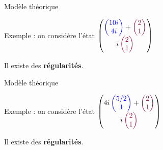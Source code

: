 \begin{frame}[noframenumbering]{Modèle théorique} %

  Exemple : on considère l'état $\begin{pmatrix}
    \color{blue} \begin{pmatrix} 10i \\ 4i \end{pmatrix} \color{black} + \color{cs} \begin{pmatrix} 2 \\ 1 \end{pmatrix}
  \\ \color{black} i \color{cs} \begin{pmatrix} 2 \\ 1 \end{pmatrix}
  \end{pmatrix}$

  \vspace{1em}
  Il existe des \textbf{régularités}.
\end{frame}

\begin{frame}[noframenumbering]{Modèle théorique} %

  Exemple : on considère l'état $\begin{pmatrix}
    4i \color{blue} \begin{pmatrix} 5/2 \\ 1 \end{pmatrix} \color{black} + \color{cs} \begin{pmatrix} 2 \\ 1 \end{pmatrix}
  \\ \color{black} i \color{cs} \begin{pmatrix} 2 \\ 1 \end{pmatrix}
  \end{pmatrix}$

  \vspace{1em}
  Il existe des \textbf{régularités}.
\end{frame}

